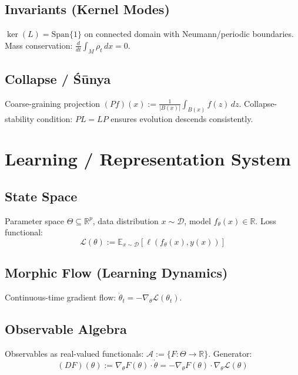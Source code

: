 \documentclass[12pt, oneside]{article}
\begin{document}
\subsection{Invariants (Kernel Modes)}

$\ker(L) = \text{Span}\{1\}$ on connected domain with Neumann/periodic boundaries. Mass conservation: $\frac{d}{dt} \int_M \rho_t \, dx = 0$.

\subsection{Collapse / Śūnya}

Coarse-graining projection $(Pf)(x) := \frac{1}{|B(x)|} \int_{B(x)} f(z) \, dz$. Collapse-stability condition: $PL = LP$ ensures evolution descends consistently.

\section{Learning / Representation System}

\subsection{State Space}

Parameter space $\Theta \subseteq \mathbb{R}^p$, data distribution $x \sim \mathcal{D}$, model $f_\theta(x) \in \mathbb{R}$. Loss functional:
\begin{equation}
\mathcal{L}(\theta) := \mathbb{E}_{x \sim \mathcal{D}} [\ell(f_\theta(x), y(x))]
\end{equation}

\subsection{Morphic Flow (Learning Dynamics)}

Continuous-time gradient flow: $\dot{\theta}_t = -\nabla_\theta \mathcal{L}(\theta_t)$.

\subsection{Observable Algebra}

Observables as real-valued functionals: $\mathcal{A} := \{ F: \Theta \rightarrow \mathbb{R} \}$. Generator:
\begin{equation}
(DF)(\theta) := \nabla_\theta F(\theta) \cdot \dot{\theta} = -\nabla_\theta F(\theta) \cdot \nabla_\theta \mathcal{L}(\theta)
\end{equation}
\end{document}
